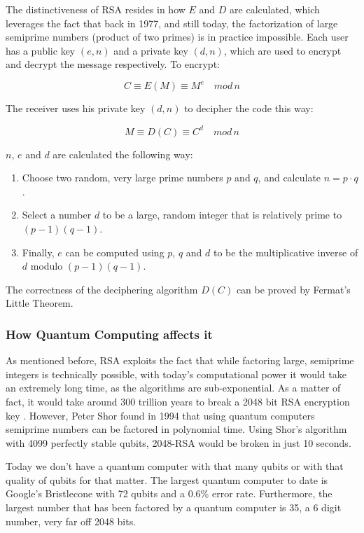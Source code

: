The distinctiveness of RSA resides in how $E$ and $D$ are calculated, which
leverages the fact that back in 1977, and still today, the factorization of
large semiprime numbers (product of two primes) is in practice impossible. Each
user has a public key $(e, n)$ and a private key $(d,n)$, which are used to encrypt
and decrypt the message respectively. To encrypt:

\begin{equation}
    C \equiv E(M) \equiv M^e \quad mod \, n
\end{equation}

The receiver uses his private key $(d,n)$ to decipher the code this way:

\begin{equation}
    M \equiv D(C) \equiv C^d \quad mod \, n
\end{equation}

$n$, $e$ and $d$ are calculated the following way:
\begin{enumerate}
    \item Choose two random, very large prime numbers $p$ and $q$, and calculate $n = p \cdot q$.
    \item Select a number $d$ to be a large, random integer that is relatively prime to $(p-1)(q-1)$.
    \item Finally, $e$ can be computed using $p$, $q$ and $d$ to be the multiplicative inverse of $d$ modulo $(p-1)(q-1)$.
\end{enumerate}

The correctness of the deciphering algorithm $D(C)$ can be proved by Fermat's Little Theorem.

\subsubsection{How Quantum Computing affects it}

As mentioned before, RSA exploits the fact that while factoring large,
semiprime integers is technically possible, with today’s computational
power it would take an extremely long time, as the algorithms are
sub-exponential. As a matter of fact, it would take around 300 trillion
years to break a 2048 bit RSA encryption key 
\cite{andreas_baumhof_breaking_2019}. However, Peter Shor found
in 1994 that using quantum computers semiprime numbers can be factored
in polynomial time. Using Shor’s algorithm with 4099 perfectly stable
qubits, 2048-RSA would be broken in just 10 seconds. 

Today we don’t have a quantum computer with that many qubits or with
that quality of qubits for that matter. The largest quantum computer to
date is Google’s Bristlecone with 72 qubits and a 0.6\% error rate. 
Furthermore, the largest number that has been factored by a quantum 
computer is 35, a 6 digit number, very far off 2048 bits.

